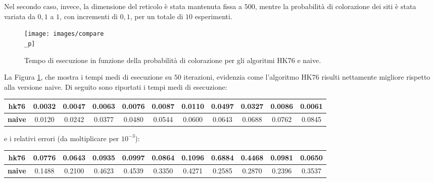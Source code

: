 \vspace{15px}
\noindent
Nel secondo caso, invece, la dimensione del reticolo è stata mantenuta fissa a $500$, mentre la probabilità di colorazione dei siti è stata variata da $0{,}1$ a $1$, con incrementi di $0{,}1$, per un totale di $10$ esperimenti. 
\begin{figure}[H]
	\centering
	\texttt{[image: images/compare\\\_p]}
	\caption{Tempo di esecuzione in funzione della probabilità di colorazione per gli algoritmi HK76 e naive.}
	\label{fig:comparep}
\end{figure}
\noindent
La Figura \ref{fig:comparep}, che mostra i tempi medi di esecuzione su $50$ iterazioni, evidenzia come l’algoritmo HK76 risulti nettamente migliore rispetto alla versione naive. Di seguito sono riportati i tempi medi di esecuzione:

\vspace{15px}
\noindent
\begin{tabular}{|c|*{10}{c|}}
	\hline
	\textbf{hk76} &0.0032 &   0.0047 &   0.0063  &  0.0076 &   0.0087   &  0.0110   & 0.0497  &  0.0327    &0.0086    & 0.0061 \\
	\hline
	\textbf{naive} &0.0120 &   0.0242 &   0.0377   & 0.0480  &  0.0544 &   0.0600  &  0.0643  &  0.0688 &   0.0762 &   0.0845
	\\
	\hline
\end{tabular}

\vspace{15px}
\noindent
e i relativi errori (da moltiplicare per $10^{-3}$):

\vspace{15px}
\noindent
\begin{tabular}{|c|*{10}{c|}}
	\hline
	\textbf{hk76}  & 0.0776  &  0.0643 &   0.0935 &   0.0997&    0.0864  &  0.1096   & 0.6884  &  0.4468&    0.0981  &  0.0650\\
	\hline
	\textbf{naive}  & 0.1488  &  0.2100 &   0.4623  &  0.4539 &   0.3350  &  0.4271 &   0.2585  &  0.2870 &   0.2396 &   0.3537\\
	\hline
\end{tabular}

\vspace{15px}
\noindent